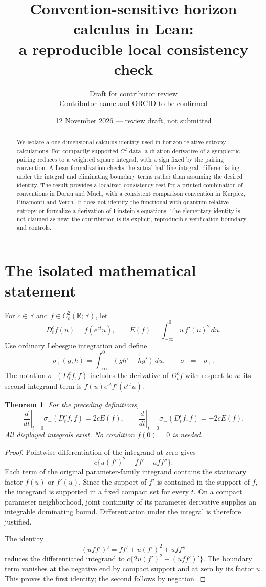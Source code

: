 \documentclass[11pt]{article}
\title{Convention-sensitive horizon calculus in Lean:\\a reproducible local consistency check}
\author{Draft for contributor review\\\small Contributor name and ORCID to be confirmed}
\date{12 November 2026 --- review draft, not submitted}
\newtheorem{theorem}{Theorem}
\newcommand{\R}{\mathbb R}
\begin{document}
\maketitle
\begin{abstract}
We isolate a one-dimensional calculus identity used in horizon relative-entropy calculations. For compactly supported $C^2$ data, a dilation derivative of a symplectic pairing reduces to a weighted square integral, with a sign fixed by the pairing convention. A Lean formalization checks the actual half-line integral, differentiating under the integral and eliminating boundary terms rather than assuming the desired identity. The result provides a localized consistency test for a printed combination of conventions in Dorau and Much, with a consistent comparison convention in Kurpicz, Pinamonti and Verch. It does not identify the functional with quantum relative entropy or formalize a derivation of Einstein's equations. The elementary identity is not claimed as new; the contribution is its explicit, reproducible verification boundary and controls.
\end{abstract}

\section{The isolated mathematical statement}
For $c\in\R$ and $f\in C_c^2(\R;\R)$, let
\[
 D_t^c f(u)=f(e^{ct}u),\qquad
 E(f)=\int_{-\infty}^0 u\,f'(u)^2\,du.
\]
Use ordinary Lebesgue integration and define
\[
 \sigma_+(g,h)=\int_{-\infty}^0(gh'-hg')\,du,
 \qquad \sigma_-=-\sigma_+.
\]
The notation $\sigma_+(D_t^c f,f)$ includes the derivative of $D_t^c f$ with respect to $u$: its second integrand term is
$f(u)e^{ct}f'(e^{ct}u)$.
\begin{theorem}\label{thm:main}
For the preceding definitions,
\[
 \left.\frac{d}{dt}\right|_{t=0}\sigma_+(D_t^c f,f)=2cE(f),
 \qquad
 \left.\frac{d}{dt}\right|_{t=0}\sigma_-(D_t^c f,f)=-2cE(f).
\]
All displayed integrals exist. No condition $f(0)=0$ is needed.
\end{theorem}
\begin{proof}
Pointwise differentiation of the integrand at zero gives
\[
 c\{u(f')^2-ff'-uff''\}.
\]
Each term of the original parameter-family integrand contains the stationary factor $f(u)$ or $f'(u)$. Since the support of $f'$ is contained in the support of $f$, the integrand is supported in a fixed compact set for every $t$. On a compact parameter neighborhood, joint continuity of its parameter derivative supplies an integrable dominating bound. Differentiation under the integral is therefore justified.

The identity
\[
 (uff')'=ff'+u(f')^2+uff''
\]
reduces the differentiated integrand to
$c\{2u(f')^2-(uff')'\}$. The boundary term vanishes at the negative end by compact support and at zero by its factor $u$. This proves the first identity; the second follows by negation.
\end{proof}
\end{document}
